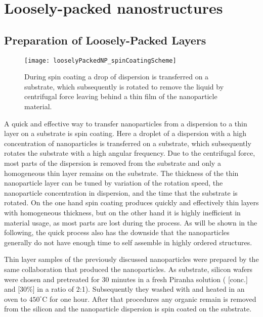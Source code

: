 \documentclass[\main/dresen_thesis.tex]{subfiles}
\renewcommand{\thisPath}{\main/chapters/looselyPackedNS}
\begin{document}
  \chapter{Loosely-packed nanostructures}\label{ch:looselyPackedNS}

    

    \section{Preparation of Loosely-Packed Layers}
      \begin{figure}[tb]
        \centering
        \texttt{[image: looselyPackedNP\_spinCoatingScheme]}
        \caption{\label{fig:looselyPackedNP:preparation:spinCoatingScheme}During spin coating a drop of dispersion is transferred on a substrate, which subsequently is rotated to remove the liquid by centrifugal force leaving behind a thin film of the nanoparticle material.}
      \end{figure}

      A quick and effective way to transfer nanoparticles from a dispersion to a thin layer on a substrate is spin coating.
      Here a droplet of a dispersion with a high concentration of nanoparticles is transferred on a substrate, which subsequently rotates the substrate with a high angular frequency.
      Due to the centrifugal force, most parts of the dispersion is removed from the substrate and only a homogeneous thin layer remains on the substrate.
      The thickness of the thin nanoparticle layer can be tuned by variation of the rotation speed, the nanoparticle concentration in dispersion, and the time that the substrate is rotated.
      On the one hand spin coating produces quickly and effectively thin layers with homogeneous thickness, but on the other hand it is highly inefficient in material usage, as most parts are lost during the process.
      As will be shown in the following, the quick process also has the downside that the nanoparticles generally do not have enough time to self assemble in highly ordered structures.

      Thin layer samples of the previously discussed nanoparticles were prepared by the same collaboration that produced the nanoparticles.
      As substrate, silicon wafers were chosen and pretreated for 30 minutes in a fresh Piranha solution ( [conc.] and  [30\%] in a ratio of 2:1). Subsequently they washed with  and heated in an oven to $450 ^\circ \mathrm{C}$ for one hour.
      After that procedures any organic remain is removed from the silicon and the nanoparticle dispersion is spin coated on the substrate.
\end{document}
